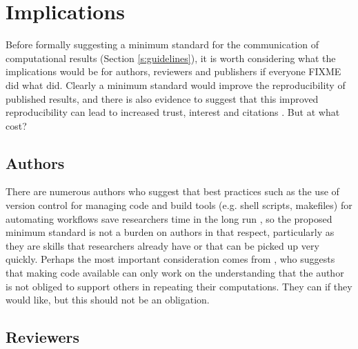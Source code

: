 \section{Implications}

Before formally suggesting a minimum standard for the communication of computational results (Section \ref{s:guidelines}), it is worth considering what the implications would be for authors, reviewers and publishers if everyone FIXME did what \citet{Irving2015} did. Clearly a minimum standard would improve the reproducibility of published results, and there is also evidence to suggest that this improved reproducibility can lead to increased trust, interest and citations \citep{Piwowar2007}. But at what cost?

\subsection{Authors}

There are numerous authors who suggest that best practices such as the use of version control for managing code and build tools (e.g. shell scripts, makefiles) for automating workflows save researchers time in the long run \citep[e.g.][]{Sandve2013,Wilson2014a}, so the proposed minimum standard is not a burden on authors in that respect, particularly as they are skills that researchers already have or that can be picked up very quickly. Perhaps the most important consideration comes from \citet{Easterbrook2014}, who suggests that making code available can only work on the understanding that the author is not obliged to support others in repeating their computations. They can if they would like, but this should not be an obligation.

\subsection{Reviewers}


